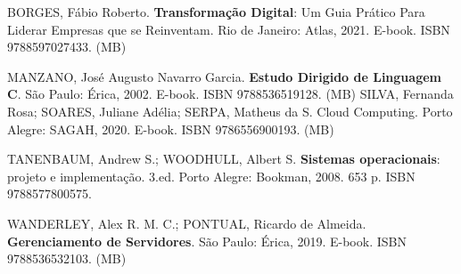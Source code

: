 \begin{pud}
	
	\begin{bibcomplementar}
		\item BORGES, Fábio Roberto. \textbf{Transformação Digital}: Um Guia Prático Para Liderar
Empresas que se Reinventam. Rio de Janeiro: Atlas, 2021. E-book. ISBN
9788597027433. (MB)
		\item MANZANO, José Augusto Navarro Garcia. \textbf{Estudo Dirigido de Linguagem C}.
São Paulo: Érica, 2002. E-book. ISBN 9788536519128. (MB)
SILVA, Fernanda Rosa; SOARES, Juliane Adélia; SERPA, Matheus da S. Cloud
Computing. Porto Alegre: SAGAH, 2020. E-book. ISBN 9786556900193. (MB)
		\item TANENBAUM, Andrew S.; WOODHULL, Albert S. \textbf{Sistemas operacionais}:
projeto e implementação. 3.ed. Porto Alegre: Bookman, 2008. 653 p. ISBN
9788577800575.
		\item WANDERLEY, Alex R. M. C.; PONTUAL, Ricardo de Almeida. \textbf{Gerenciamento de
Servidores}. São Paulo: Érica, 2019. E-book. ISBN 9788536532103. (MB)
	\end{bibcomplementar}
\end{pud}




